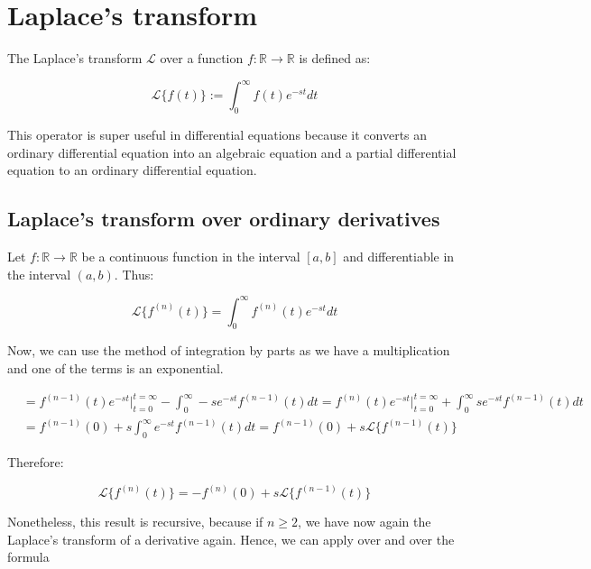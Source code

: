 \documentclass[12pt]{article}
\begin{document}
	\section{Laplace's transform}
	
	The Laplace's transform $\mathcal{L}$ over a function $f : \mathbb{R} \to \mathbb{R}$ is defined as:
	
	\[
		\mathcal{L}\{f(t)\} := \int_{0}^\infty f(t) e^{-st} dt
	\]
	
	This operator is super useful in differential equations because it converts an ordinary differential equation into an algebraic equation and a partial differential equation to an ordinary differential equation.
	
	\subsection{Laplace's transform over ordinary derivatives}
	
	Let $f : \mathbb{R} \to \mathbb{R}$ be a continuous function in the interval $[a, b]$ and differentiable in the interval $(a, b)$. Thus:
	
	\[
		\mathcal{L}\{f^{(n)}(t)\} = \int_0^\infty f^{(n)}(t) e^{-st}dt
	\]
	
	Now, we can use the method of integration by parts as we have a multiplication and one of the terms is an exponential.
	
	\[
		\begin{aligned}
			& = f^{(n - 1)}(t)e^{-st} \bigg|_{t = 0}^{t = \infty} - \int_0^\infty -se^{-st}f^{(n - 1)}(t)dt
			= f^{(n)}(t)e^{-st} \bigg|_{t = 0}^{t = \infty} + \int_0^\infty se^{-st}f^{(n - 1)}(t)dt
			\\
			& = f^{(n - 1)}(0) + s\int_0^\infty e^{-st}f^{(n - 1)}(t)dt
			= f^{(n - 1)}(0) + s \mathcal{L}\{f^{(n - 1)}(t)\}
		\end{aligned}
	\]
	
	Therefore:
	
	\[
		\mathcal{L}\{f^{(n)}(t)\} = -f^{(n)}(0) + s \mathcal{L}\{f^{(n - 1)}(t)\}
	\]
	
	Nonetheless, this result is recursive, because if $n \ge 2$, we have now again the Laplace's transform of a derivative again. Hence, we can apply over and over the formula
	
\end{document}
